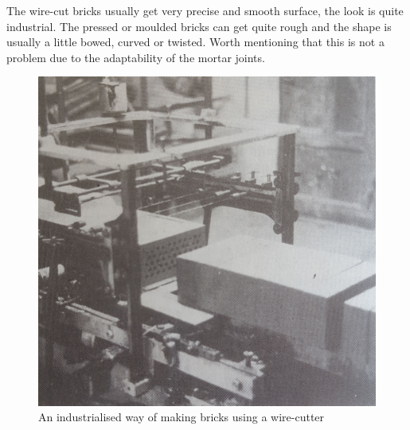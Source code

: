 The wire-cut bricks usually get very precise and smooth surface, the look is quite industrial. The pressed or moulded bricks can get quite rough and the shape is usually a little bowed, curved or twisted. Worth mentioning that this is not a problem due to the adaptability of the mortar joints. 

\begin{figure}[H]
\centering
\includegraphics[width=0.9\linewidth ]{figure/Theory/wireBrick.jpg}
\caption{An industrialised way of making bricks using a wire-cutter\cite{ref:tegel}}
\label{fig:wire}
\end{figure}

